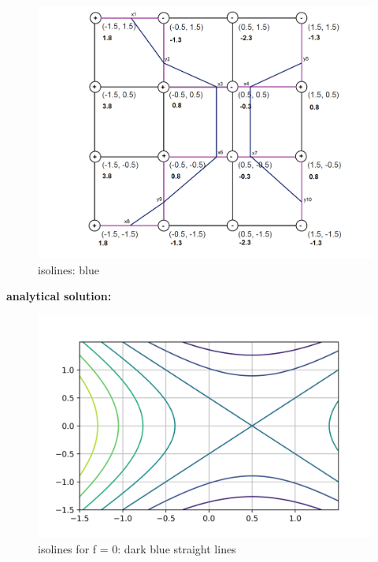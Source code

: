 \documentclass[a4paper]{article}
\begin{document}
\begin{enumerate}
					
			\begin{figure}[h!]
				\centering 
				\includegraphics[width=\linewidth]{7_2_2_2.pdf}
				\caption{isolines: blue}
				\label{}
			\end{figure}
			
\end{enumerate}

\clearpage
\textbf{analytical solution:} \\


\begin{figure}[h!]
	\centering 
	\includegraphics[width=13cm]{analytical.png}
	\caption{isolines for f = 0: dark blue straight lines}
	\label{}
\end{figure}
\end{document}
